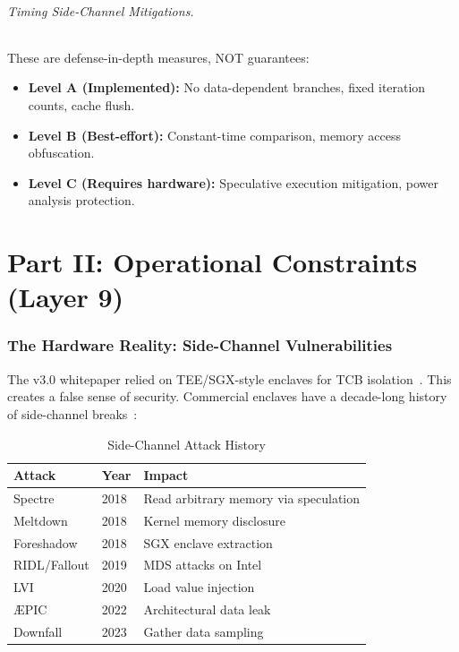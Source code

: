 \documentclass[11pt,letterpaper]{article}
\theoremstyle{definition}
\theoremstyle{remark}
\begin{document}
\paragraph{Timing Side-Channel Mitigations.} These are defense-in-depth measures, NOT guarantees:
\begin{itemize}
\item \textbf{Level A (Implemented):} No data-dependent branches, fixed iteration counts, cache flush.
\item \textbf{Level B (Best-effort):} Constant-time comparison, memory access obfuscation.
\item \textbf{Level C (Requires hardware):} Speculative execution mitigation, power analysis protection.
\end{itemize}



\part*{Part II: Operational Constraints (Layer 9)}

\section{The Hardware Reality: Side-Channel Vulnerabilities}

The v3.0 whitepaper relied on TEE/SGX-style enclaves for TCB isolation~\cite{costan2016}. This creates a false sense of security. Commercial enclaves have a decade-long history of side-channel breaks~\cite{kocher2019,lipp2018,vanbulck2018}:

\begin{table}[h]
\centering
\begin{tabular}{@{}lll@{}}
\toprule
\textbf{Attack} & \textbf{Year} & \textbf{Impact} \\
\midrule
Spectre~\cite{kocher2019} & 2018 & Read arbitrary memory via speculation \\
Meltdown~\cite{lipp2018} & 2018 & Kernel memory disclosure \\
Foreshadow~\cite{vanbulck2018} & 2018 & SGX enclave extraction \\
RIDL/Fallout & 2019 & MDS attacks on Intel \\
LVI & 2020 & Load value injection \\
\AE{}PIC & 2022 & Architectural data leak \\
Downfall & 2023 & Gather data sampling \\
\bottomrule
\end{tabular}
\caption{Side-Channel Attack History}
\end{table}
\end{document}
